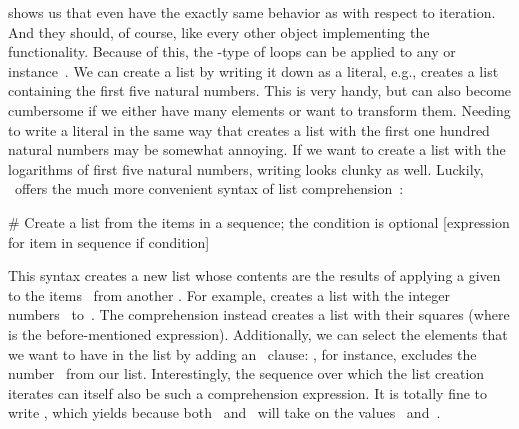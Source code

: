  shows us that even  have the exactly same behavior as  with respect to iteration.
And they should, of course, like every other object implementing the~ functionality.
Because of this, the -type of loops can be applied to any  or  instance~.%
%
\endhsection%
%
%
%
We can create a list by writing it down as a literal, e.g., \pythonil{[1, 2, 3, 4, 5]} creates a list containing the first five natural numbers.
This is very handy, but can also become cumbersome if we either have many elements or want to transform them.
Needing to write a literal in the same way that creates a list with the first one hundred natural numbers may be somewhat annoying.
If we want to create a list with the logarithms of first five natural numbers, writing  looks clunky as well.
Luckily, \python\ offers the much more convenient syntax of list comprehension~\cite{PEP202}:%
%
\begin{pythonSyntax}
# Create a list from the items in a sequence; the condition is optional
[expression for item in sequence if condition]
\end{pythonSyntax}
%
%
%
%
%
\begin{sloppypar}%
This syntax creates a new list whose contents are the results of applying a given  to the items~ from another .
For example,  creates a list with the integer numbers~ to~.
The comprehension  instead creates a list with their squares (where  is the before-mentioned expression).
Additionally, we can select the elements that we want to have in the list by adding an ~clause:
\pythonil{[i for i in range(10) if i != 3]}, for instance, excludes the number~ from our list.
Interestingly, the sequence over which the list creation iterates can itself also be such a comprehension expression.
It is totally fine to write , which yields \pythonil{[0, 0, 0, 1]} because both~ and~ will take on the values~ and~.%
\end{sloppypar}%
